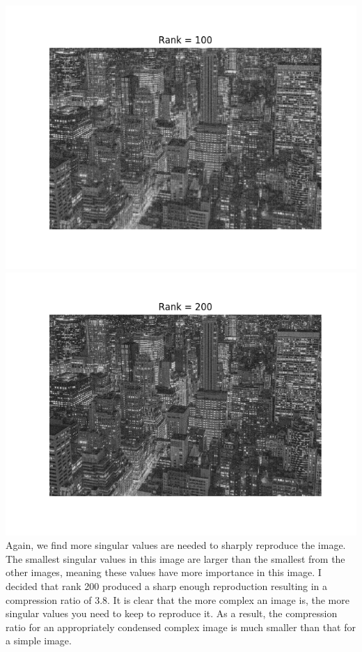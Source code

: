 \documentclass[11pt]{article}
\begin{document}
\begin{enumerate}
\includegraphics[scale=.55]{ny_compress_100.png}
\includegraphics[scale=.55]{ny_compress_200.png}\\
Again, we find more singular values are needed to sharply reproduce the image. The smallest singular values in this image are larger than the smallest from the other images, meaning these values have more importance in this image. I decided that rank 200 produced a sharp enough reproduction resulting in a compression ratio of 3.8. It is clear that the more complex an image is, the more singular values you need to keep to reproduce it. As a result, the compression ratio for an appropriately condensed complex image is much smaller than that for a simple image.
\end{enumerate}
\end{document}
